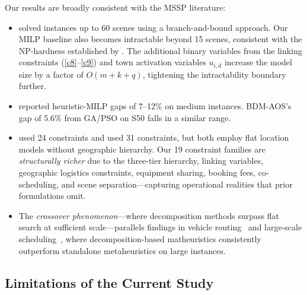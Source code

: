 Our results are broadly consistent with the MSSP literature:
\begin{itemize}
    \item \citet{bomsdorf2008} solved instances up to 60 scenes using a branch-and-bound approach. Our MILP baseline also becomes intractable beyond 15 scenes, consistent with the NP-hardness established by \citet{garey1979}. The additional binary variables from the linking constraints (\ref{c8}--\ref{c9}) and town activation variables $u_{i,d}$ increase the model size by a factor of $O(m + k + q)$, tightening the intractability boundary further.
    \item \citet{nordstrom2022} reported heuristic-MILP gaps of 7--12\% on medium instances. BDM-AOS's gap of 5.6\% from GA/PSO on S50 falls in a similar range.
    \item \citet{liu2019} used 24 constraints and \citet{tekin2023} used 31 constraints, but both employ flat location models without geographic hierarchy. Our 19 constraint families are \emph{structurally richer} due to the three-tier hierarchy, linking variables, geographic logistics constraints, equipment sharing, booking fees, co-scheduling, and scene separation---capturing operational realities that prior formulations omit.
    \item The \emph{crossover phenomenon}---where decomposition methods surpass flat search at sufficient scale---parallels findings in vehicle routing~\citep{rahimian2017} and large-scale scheduling~\citep{maniezzo2010}, where decomposition-based matheuristics consistently outperform standalone metaheuristics on large instances.
\end{itemize}

\subsection{Limitations of the Current Study}

